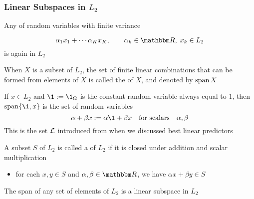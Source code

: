 \begin{frame}\frametitle{Linear Subspaces in $L_2$}

    \vspace{2em}
    Any   of random variables with finite variance
    
    \begin{equation}
        \alpha_1 x_1 + \cdots \alpha_K x_K,
        \qquad \alpha_k \in \RR, \; x_k \in L_2
    \end{equation}
    is again in $L_2$
    
    When $X$ is a subset of $L_2$, the set of finite linear
    combinations that can be formed from elements of $X$ is called the 
    of $X$, and denoted by $\operatorname{span} X$
    
\end{frame}

\begin{frame}

    \vspace{2em}
    \Eg
    If $x \in L_2$ and $\1 := \1_\Omega$ is the constant random variable 
    always equal to $1$, then $\Span\{\1, x\}$ is the set of random variables
    \begin{equation}
        \label{eq:llasp}
         \alpha + \beta x 
         := \alpha \1 + \beta x
         \quad \text{for scalars} \quad
         \alpha, \beta   
    \end{equation}
    This is the set $\mathcal L$ introduced from when we
    discussed best linear predictors
    
\end{frame}

\begin{frame}

    \vspace{2em}
    A subset $S$ of $L_2$ is called a
     of $L_2$ if it is closed under addition and scalar
    multiplication
    \begin{itemize}
        \item for each $x, y \in S$ and $\alpha, \beta \in \RR$,
    we have $\alpha x + \beta y \in S$
    \end{itemize}

    \vspace{1em}
    \Eg
    The span of any set of elements of $L_2$ is a linear subspace in $L_2$

\end{frame}

